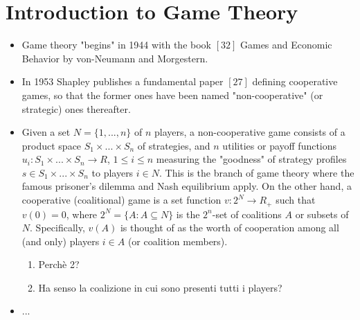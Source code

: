 \chapter{Introduction to Game Theory}
\begin{itemize}
	\item Game theory "begins" in 1944 with the book $[32]$ Games and Economic Behavior by von-Neumann and Morgestern.
	
	\item In 1953 Shapley publishes a fundamental paper $[27]$ defining cooperative games, so that the former ones have been named "non-cooperative" (or strategic) ones thereafter.
	
	\item Given a set $N=\{1,...,n\}$ of $n$ players, a non-cooperative game consists of a product space $S_1 \times ... \times S_n$ of strategies, and $n$ utilities or payoff functions $u_i:S_1 \times ... \times S_n \to R$, $1 \le i \le n$ measuring the "goodness" of strategy profiles $s \in S_1 \times ... \times S_n$ to players $i \in N$. This is the branch of game theory where the famous prisoner's dilemma and Nash equilibrium apply. On the other hand, a cooperative (coalitional) game is a set function $v:2^N \to R_+$ such that $v(0)=0$, where $2^N = \{A:A \subseteq N\}$ is the $2^n$-set of coalitions $A$ or subsets of $N$. Specifically, $v(A)$ is thought of as the worth of cooperation among all (and only) players $i \in A$ (or coalition members).
	\begin{enumerate}
		\item Perch\`e 2?
		\item Ha senso la coalizione in cui sono presenti tutti i players?
	\end{enumerate}
	\item ...
\end{itemize}